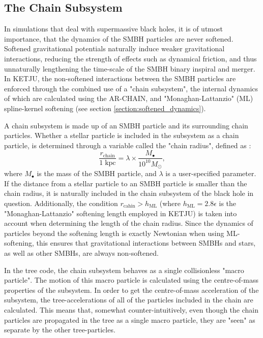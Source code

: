 \documentclass[english, twoside]{HYgradu}
\begin{document}
\subsection{The Chain Subsystem}

In simulations that deal with supermassive black holes, it is of utmost importance, that the dynamics of the SMBH particles are never softened. Softened gravitational potentials naturally induce weaker gravitational interactions, reducing the strength of effects such as dynamical friction, and thus unnaturally lengthening the time-scale of the SMBH binary inspiral and merger. In KETJU, the non-softened interactions between the SMBH particles are enforced through the combined use of a "chain subsystem", the internal dynamics of which are calculated using the AR-CHAIN, and "Monaghan-Lattanzio" (ML) spline-kernel softening (see section \ref{section:softened_dynamics}). 

A chain subsystem is made up of an SMBH particle and its surrounding chain particles. Whether a stellar particle is included in the subsystem as a chain particle, is determined through a variable called the "chain radius", defined as \citep{Rantala2017KETJU}:
\begin{equation}
\frac{r_\mathrm{chain}}{1 \; \mathrm{kpc}} = \lambda \times \frac{M_\bullet}{10^{10} M_\odot},
\end{equation}
where $M_\bullet$ is the mass of the SMBH particle, and $\lambda$ is a user-specified parameter. If the distance from a stellar particle to an SMBH particle is smaller than the chain radius, it is naturally included in the chain subsystem of the black hole in question. Additionally, the condition $r_\mathrm{cahin} > h_\mathrm{ML}$ (where $h_\mathrm{ML} = 2.8\epsilon$ is the "Monaghan-Lattanzio" softening length employed in KETJU) is taken into account when determining the length of the chain radius. Since the dynamics of particles beyond the softening length is exactly Newtonian when using ML-softening, this ensures that gravitational interactions between SMBHs and stars, as well as other SMBHs, are always non-softened.

In the tree code, the chain subsystem behaves as a single collisionless "macro particle". The motion of this macro particle is calculated using the centre-of-mass properties of the subsystem. In order to get the centre-of-mass acceleration of the subsystem, the tree-accelerations of all of the particles included in the chain are calculated. This means that, somewhat counter-intuitively, even though the chain particles are propagated in the tree as a single macro particle, they are "seen" as separate by the other tree-particles.
\end{document}
